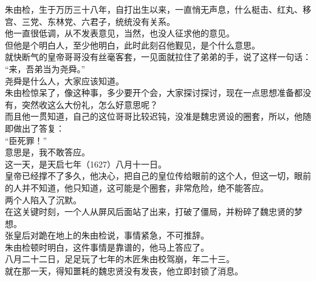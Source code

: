 \begin{multicols}{\theparacolNo}
朱由检，生于万历三十八年，自打出生以来，一直悄无声息，什么梃击、红丸、移宫、三党、东林党、六君子，统统没有关系。\\

他一直很低调，从不发表意见，当然，也没人征求他的意见。\\

但他是个明白人，至少他明白，此时此刻召他觐见，是个什么意思。\\

就快断气的皇帝哥哥没有丝毫客套，一见面就拉住了弟弟的手，说了这样一句话：\\

“来，吾弟当为尧舜。”\\

尧舜是什么人，大家应该知道。\\

朱由检惊呆了，像这种事，多少要开个会，大家探讨探讨，现在一点思想准备都没有，突然收这么大份礼，怎么好意思呢？\\

而且他一贯知道，自己的这位哥哥比较迟钝，没准是魏忠贤设的圈套，所以，他随即做出了答复：\\

“臣死罪！”\\

意思是，我不敢答应。\\

这一天，是天启七年（1627）八月十一日。\\

皇帝已经撑不了多久，他决心，把自己的皇位传给眼前的这个人，但这一切，眼前的人并不知道，他只知道，这可能是个圈套，非常危险，绝不能答应。\\

两个人陷入了沉默。\\

在这关键时刻，一个人从屏风后面站了出来，打破了僵局，并粉碎了魏忠贤的梦想。\\

张皇后对跪在地上的朱由检说，事情紧急，不可推辞。\\

朱由检顿时明白，这件事情是靠谱的，他马上答应了。\\

八月二十二日，足足玩了七年的木匠朱由校驾崩，年二十三。\\

就在那一天，得知噩耗的魏忠贤没有发丧，他立即封锁了消息。\\
\ifnum{}
	\end{multicols}
\fi
\newpage

